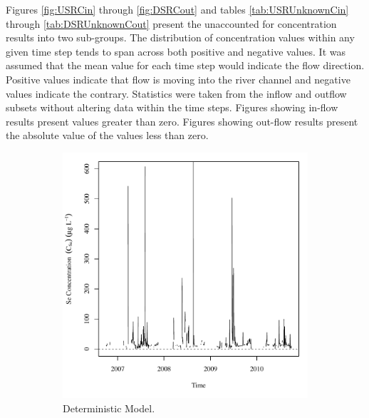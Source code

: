 \begin{linenumbers}
Figures \ref{fig:USRCin} through \ref{fig:DSRCout} and tables \ref{tab:USRUnknownCin} through \ref{tab:DSRUnknownCout} present the unaccounted for concentration results into two sub-groups.  The distribution of concentration values within any given time step tends to span across both positive and negative values.  It was assumed that the mean value for each time step would indicate the flow direction.  Positive values indicate that flow is moving into the river channel and negative values indicate the contrary.  Statistics were taken from the inflow and outflow subsets without altering data within the time steps.  Figures showing in-flow results present values greater than zero.  Figures showing out-flow results present the absolute value of the values less than zero.

\begin{figure}[htbp]
\centering
	\begin{subfigure}{0.5\textwidth}
		\centering
		\includegraphics[width=0.9\linewidth]{"Figures/Results_DUSR/Balance Cin"}
		\caption{Deterministic Model.}
	\end{subfigure}%
	\begin{subfigure}{0.5\textwidth}
		\centering

\end{subfigure}
\end{figure}
\end{linenumbers}
